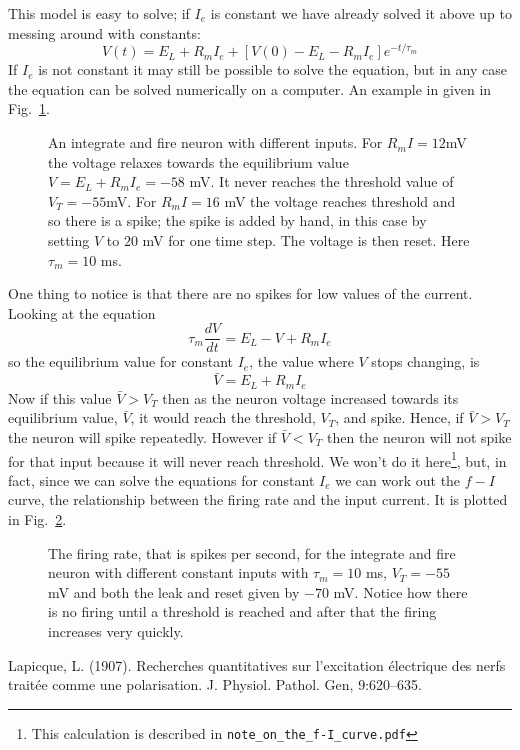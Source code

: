 \documentclass{article}
\begin{document}
This model is easy to solve; if $I_e$ is constant we have already
solved it above up to messing around with constants:
\begin{equation}
V(t)=E_L+R_mI_e+[V(0)-E_L-R_mI_e]e^{-t/\tau_m}
\end{equation}
If $I_e$ is not
constant it may still be possible to solve the equation, but in any
case the equation can be solved numerically on a computer. An example
in given in Fig.~\ref{v_i_f}.

\begin{figure}
\begin{center}

\end{center}
\caption{An integrate and fire neuron with different inputs. For
  $R_mI=12 $mV the voltage relaxes towards the equilibrium value
  $V=E_L+R_mI_e=-58$ mV. It never reaches the threshold value of
  $V_T=-55 $mV. For $R_mI=16$ mV the voltage reaches threshold and so
  there is a spike; the spike is added by hand, in this case by
  setting $V$ to $20$ mV for one time step. The voltage is then
  reset. Here $\tau_m=10$ ms.\label{v_i_f}}
\end{figure}

One thing to notice is that there are no spikes for low values of the current. Looking at the equation 
\begin{equation}
\tau_m\frac{dV}{dt}=E_L-V+R_mI_e
\end{equation}
so the equilibrium value for constant $I_e$, the value where $V$ stops changing, is
\begin{equation}
\bar{V}=E_L+R_mI_e
\end{equation}
Now if this value $\bar{V}>V_T$ then as the neuron voltage increased
towards its equilibrium value, $\bar{V}$, it would reach the
threshold, $V_T$, and spike. Hence, if $\bar{V}>V_T$ the neuron will
spike repeatedly.  However if $\bar{V}<V_T$ then the neuron will not
spike for that input because it will never reach threshold. We won't do it here\footnote{This calculation is described in \texttt{note\_on\_the\_f-I\_curve.pdf}}, but, in fact, since we can
solve the equations for constant $I_e$ we can work out the $f-I$
curve, the relationship between the firing rate and the input
current. It is plotted in Fig.~\ref{f_i_curve}.


\begin{figure}
\begin{center}

\end{center}
\caption{The firing rate, that is spikes per second, for the integrate
  and fire neuron with different constant inputs with $\tau_m=10$ ms,
  $V_T=-55$ mV and both the leak and reset given by $-70$ mV. Notice
  how there is no firing until a threshold is reached and after that
  the firing increases very quickly. \label{f_i_curve}}
\end{figure}


\begin{thebibliography}{99}
Lapicque, L. (1907). 
\newblock Recherches quantitatives sur l'excitation \'{e}lectrique des nerfs trait\'{e}e comme une polarisation. 
\newblock J. Physiol. Pathol. Gen, 9:620--635.
\end{thebibliography}
\end{document}
